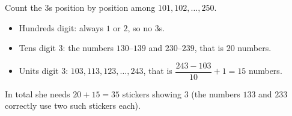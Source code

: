 Count the $3$s position by position among $101,102,\dots,250$.
\begin{itemize}
\item Hundreds digit: always $1$ or $2$, so no $3$s.
\item Tens digit $3$: the numbers $130$--$139$ and $230$--$239$, that is $20$ numbers.
\item Units digit $3$: $103,113,123,\dots,243$, that is $\dfrac{243-103}{10}+1=15$ numbers.
\end{itemize}
In total she needs $20+15=\boxed{35}$ stickers showing $3$ (the numbers $133$ and $233$ correctly use two such stickers each).
